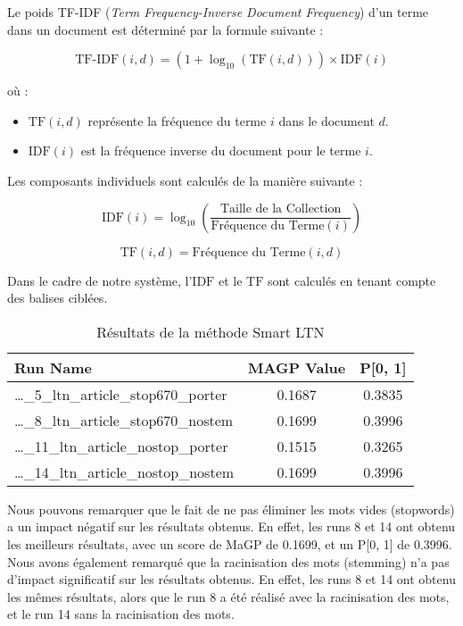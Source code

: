 \documentclass[a4paper, 12pt]{article}
\begin{document}
Le poids TF-IDF (\textit{Term Frequency-Inverse Document Frequency}) d'un terme dans un document est déterminé par la formule suivante :

\begin{equation}
\text{TF-IDF}(i, d) = \left(1 + \log_{10}(\text{TF}(i, d))\right) \times \text{IDF}(i)
\end{equation}

où :
\begin{itemize}
    \item $\text{TF}(i, d)$ représente la fréquence du terme $i$ dans le document $d$.
    \item $\text{IDF}(i)$ est la fréquence inverse du document pour le terme $i$.
\end{itemize}

Les composants individuels sont calculés de la manière suivante :

\begin{equation}
\text{IDF}(i) = \log_{10}\left(\frac{\text{Taille de la Collection}}{\text{Fréquence du Terme}(i)}\right)
\end{equation}

\begin{equation}
\text{TF}(i, d) = \text{Fréquence du Terme}(i, d)
\end{equation}

Dans le cadre de notre système, l'$\text{IDF}$ et le $\text{TF}$ sont calculés en tenant compte des balises ciblées.

\begin{table}[h]
    \centering
    \begin{tabular}{l c c}
        \toprule
        \textbf{Run Name} & \textbf{MAGP Value} & \textbf{P[0, 1]} \\
        \midrule
        \dots\_5\_ltn\_article\_stop670\_porter & 0.1687 & 0.3835 \\
        \dots\_8\_ltn\_article\_stop670\_nostem & 0.1699 & 0.3996 \\
        \dots\_11\_ltn\_article\_nostop\_porter & 0.1515 & 0.3265 \\
        \dots\_14\_ltn\_article\_nostop\_nostem & 0.1699 & 0.3996 \\
        \bottomrule
    \end{tabular}
    \caption{Résultats de la méthode Smart LTN}
    \label{tab:result_ltn}
\end{table}

Nous pouvons remarquer que le fait de ne pas éliminer les mots vides (stopwords) 
a un impact négatif sur les résultats obtenus. En effet, les runs 8 et 14 ont obtenu les meilleurs résultats,
avec un score de MaGP de 0.1699, et un P[0, 1] de 0.3996. Nous avons également remarqué que la racinisation des mots (stemming)
n'a pas d'impact significatif sur les résultats obtenus. En effet, les runs 8 et 14 ont obtenu les mêmes résultats,
alors que le run 8 a été réalisé avec la racinisation des mots, et le run 14 sans la racinisation des mots.
\end{document}
